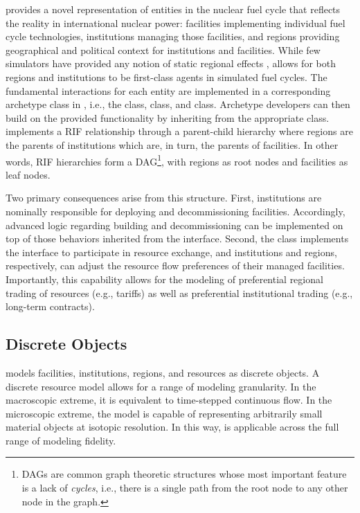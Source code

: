 \Cyclus provides a novel representation of entities in the nuclear fuel cycle
that reflects the reality in international nuclear power: facilities implementing individual fuel cycle technologies, institutions managing those facilities, and regions providing geographical and political context for institutions and facilities. While
few simulators have provided any notion of static regional
effects \cite{huff_next_2010,juchau_modeling_2010}, \Cyclus allows for both regions and institutions to be first-class
agents in simulated fuel cycles. The fundamental interactions for each entity are implemented in a corresponding
archetype class in \Cyclus, i.e., the  class, 
class, and  class. Archetype developers can then build on the
provided functionality by inheriting from the appropriate class.
\Cyclus implements a \gls{RIF} relationship through a
parent-child hierarchy where
regions are the parents of institutions which are, in turn, the parents of
facilities. In other words, \gls{RIF} hierarchies form a \gls{DAG}\footnote{
\gls{DAG}s are common graph theoretic structures whose most important feature is a 
lack of \emph{cycles}, i.e., there is a single path from the root node to any other 
node in the graph. 
},
with regions as root nodes and facilities as leaf nodes.

Two primary consequences arise from this structure. First, institutions are
nominally responsible for deploying and decommissioning facilities. Accordingly, advanced
logic regarding building and decommissioning can be implemented on top of
those behaviors inherited from the
 interface. Second, the  class implements the
 interface to participate in resource exchange, and institutions and regions, respectively, can
adjust the resource flow preferences of their managed facilities. Importantly,
this capability allows for the modeling of preferential regional trading
of resources (e.g., tariffs) as well as preferential institutional trading
(e.g., long-term contracts).

\subsection{Discrete Objects}

\Cyclus models facilities, institutions, regions, and resources as discrete
objects. A discrete resource model allows for a range of modeling granularity. In the
macroscopic extreme, it is equivalent to time-stepped continuous flow. In the
microscopic extreme, the model is capable of representing arbitrarily small
material objects at isotopic resolution. In this way, \Cyclus is
applicable across the full range of modeling fidelity.

